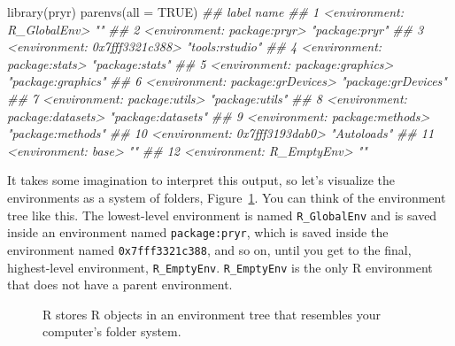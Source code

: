 \documentclass[
  letterpaper,
  DIV=11,
  numbers=noendperiod]{scrbook}
\makeatletter
\newenvironment{Shaded}{\begin{snugshade}}{\end{snugshade}}
\newcommand{\AttributeTok}[1]{\textcolor[rgb]{0.40,0.45,0.13}{#1}}
\newcommand{\ConstantTok}[1]{\textcolor[rgb]{0.56,0.35,0.01}{#1}}
\newcommand{\DocumentationTok}[1]{\textcolor[rgb]{0.37,0.37,0.37}{\textit{#1}}}
\newcommand{\FunctionTok}[1]{\textcolor[rgb]{0.28,0.35,0.67}{#1}}
\newcommand{\NormalTok}[1]{\textcolor[rgb]{0.00,0.23,0.31}{#1}}
\newcommand*\pandocbounded[1]{%
  \sbox\pandoc@box{#1}%
  \Gscale@div\@tempa{\textheight}{\dimexpr\ht\pandoc@box+\dp\pandoc@box\relax}%
  \Gscale@div\@tempb{\linewidth}{\wd\pandoc@box}%
  \ifdim\@tempb\p@<\@tempa\p@\let\@tempa\@tempb\fi%
  \ifdim\@tempa\p@<\p@\scalebox{\@tempa}{\usebox\pandoc@box}%
  \else\usebox{\pandoc@box}%
  \fi%
}
\makeatother
\begin{document}
\begin{Shaded}
\begin{Highlighting}[]
\FunctionTok{library}\NormalTok{(pryr)}
\FunctionTok{parenvs}\NormalTok{(}\AttributeTok{all =} \ConstantTok{TRUE}\NormalTok{)}
\DocumentationTok{\#\#    label                            name               }
\DocumentationTok{\#\# 1  \textless{}environment: R\_GlobalEnv\textgreater{}       ""                 }
\DocumentationTok{\#\# 2  \textless{}environment: package:pryr\textgreater{}  "package:pryr" }
\DocumentationTok{\#\# 3  \textless{}environment: 0x7fff3321c388\textgreater{}    "tools:rstudio"    }
\DocumentationTok{\#\# 4  \textless{}environment: package:stats\textgreater{}     "package:stats"    }
\DocumentationTok{\#\# 5  \textless{}environment: package:graphics\textgreater{}  "package:graphics" }
\DocumentationTok{\#\# 6  \textless{}environment: package:grDevices\textgreater{} "package:grDevices"}
\DocumentationTok{\#\# 7  \textless{}environment: package:utils\textgreater{}     "package:utils"    }
\DocumentationTok{\#\# 8  \textless{}environment: package:datasets\textgreater{}  "package:datasets" }
\DocumentationTok{\#\# 9  \textless{}environment: package:methods\textgreater{}   "package:methods"  }
\DocumentationTok{\#\# 10 \textless{}environment: 0x7fff3193dab0\textgreater{}    "Autoloads"        }
\DocumentationTok{\#\# 11 \textless{}environment: base\textgreater{}              ""                 }
\DocumentationTok{\#\# 12 \textless{}environment: R\_EmptyEnv\textgreater{}        ""                 }
\end{Highlighting}
\end{Shaded}

It takes some imagination to interpret this output, so let's visualize
the environments as a system of folders, Figure~\ref{fig-environments}.
You can think of the environment tree like this. The lowest-level
environment is named \texttt{R\_GlobalEnv} and is saved inside an
environment named \texttt{package:pryr}, which is saved inside the
environment named \texttt{0x7fff3321c388}, and so on, until you get to
the final, highest-level environment, \texttt{R\_EmptyEnv}.
\texttt{R\_EmptyEnv} is the only R environment that does not have a
parent environment.

\begin{figure}

\centering{

\pandocbounded{\texttt{[image: images/hopr\_0602.png]}}

}

\caption{\label{fig-environments}R stores R objects in an environment
tree that resembles your computer's folder system.}

\end{figure}%
\end{document}
